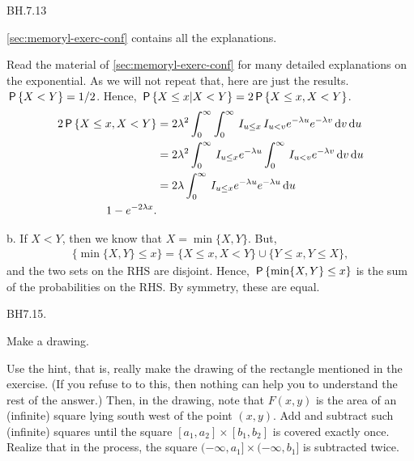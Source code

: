 \begin{exercise}
BH.7.13
\begin{hint}
\cref{sec:memoryl-exerc-conf} contains all the explanations.
\end{hint}
\begin{solution}
Read the material of \cref{sec:memoryl-exerc-conf} for many detailed explanations on the exponential. As we will not repeat that, here are just the results.
$\P{X<Y} = 1/2$. Hence, $\P{X\leq x|X<Y} = 2\P{X\leq x, X<Y}$.
\begin{align*}
2\P{X\leq x, X<Y}
  &= 2\lambda^2\int_0^{\infty}\int_0^{\infty}   \1{u\leq x} \1{u<v} e^{-\lambda u} e^{-\lambda v} \d v \d u \\
  &= 2\lambda^2\int_0^{\infty}   \1{u\leq x} e^{-\lambda u} \int_0^{\infty} \1{u<v}  e^{-\lambda v} \d v \d u\\
  &= 2\lambda\int_0^{\infty}   \1{u\leq x} e^{-\lambda u} e^{-\lambda u}  \d u \\
  1 - e^{-2\lambda x}.
\end{align*}

b. If $X<Y$, then we know that $X=\min\{X, Y\}$. But,
\begin{align*}
  \{\min\{X,Y\}\leq x\} =  \{X\leq x, X<Y\} \cup \{Y\leq x, Y\leq X\},
\end{align*}
and the two sets on the RHS are disjoint. Hence, $\P{\min\{X,Y\}\leq x}$ is the sum of the probabilities on the RHS. By symmetry, these are equal.
\end{solution}
\end{exercise}

\begin{exercise}
BH7.15.
\begin{hint}
Make a drawing.
\end{hint}
\begin{solution}
Use the hint, that is, really make the drawing of the rectangle mentioned in the exercise. (If you refuse to to this, then nothing can  help you to understand the rest of the answer.) Then, in the drawing, note that $F(x,y)$ is the area of an (infinite) square lying  south west of the point $(x,y)$. Add and subtract such (infinite) squares until the square $[a_1,a_2] \times [b_{1},b_2]$ is covered exactly once. Realize that in the process, the square $(-\infty, a_1] \times (-\infty, b_1]$ is subtracted twice.
\end{solution}
\end{exercise}



